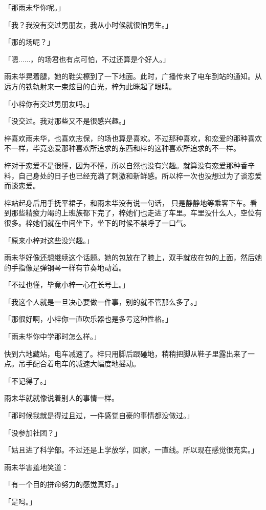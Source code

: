 \documentclass[UTF8]{ctexart}
\begin{document}
    「那雨未华你呢。」

    「我？我没有交过男朋友，我从小时候就很怕男生。」

    「那的场呢？」

    「嗯......，的场君也有点可怕，不过还算是个好人。」

    雨未华晃着腿，她的鞋尖檫到了一下地面。此时，广播传来了电车到站的通知。从远方的铁轨射来一束炫目的白光，梓为此眯起了眼睛。

    「小梓你有交过男朋友吗。」

    「没交过。我对那些又不是很感兴趣。」

    梓喜欢雨未华，也喜欢志保，的场也算是喜欢。不过那种喜欢，和恋爱的那种喜欢不一样，毕竟恋爱那种喜欢所追求的东西和梓的这种喜欢所追求的不一样。

    梓对于恋爱不是很懂，因为不懂，所以自然也没有兴趣。就算没有恋爱那种香辛料，自己身处的日子也已经充满了刺激和新鲜感。所以梓一次也没想过为了谈恋爱而谈恋爱。

    梓站起身后用手抚平裙子，和雨未华没有说一句话， 只是静静地等乘客下车。看到那些精疲力竭的上班族都下完了，梓她们也走进了车里。车里没什么人，空位有很多。梓她们就在中间坐下，坐下的时候不禁呼了一口气。

    「原来小梓对这些没兴趣。」

    雨未华好像还想继续这个话题。她的包放在了膝上，双手就放在包的上面，然后她的手指像是弹钢琴一样有节奏地动着。

    「不过也懂，毕竟小梓一心在长号上。」

    「我这个人就是一旦决心要做一件事，别的就不管那么多了。」

    「那很好啊，小梓你一直吹乐器也是多亏这种性格。」

    「雨未华你中学那时怎么样。」

    快到六地藏站，电车减速了。梓只用脚后跟碰地，稍稍把脚从鞋子里露出来了一点。吊手配合着电车的减速大幅度地摇动。

    「不记得了。」

    雨未华就就像说着别人的事情一样。

    「那时候我就是得过且过，一件感觉自豪的事情都没做过。」

    「没参加社团？」

    「姑且进了科学部。不过还是上学放学，回家，一直线。所以现在感觉很充实。」

    雨未华害羞地笑道：

    「有一个目的拼命努力的感觉真好。」

    「是吗。」
\end{document}

